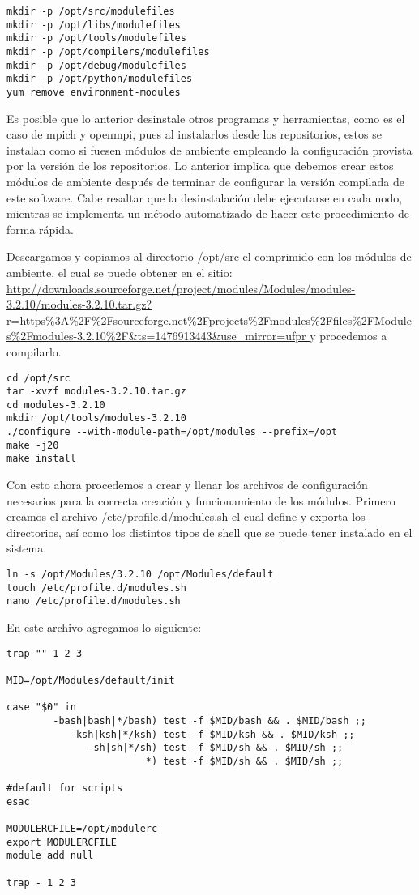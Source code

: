 \begin{lstlisting} 
mkdir -p /opt/src/modulefiles
mkdir -p /opt/libs/modulefiles
mkdir -p /opt/tools/modulefiles
mkdir -p /opt/compilers/modulefiles
mkdir -p /opt/debug/modulefiles
mkdir -p /opt/python/modulefiles
yum remove environment-modules
\end{lstlisting}

Es posible que lo anterior desinstale otros programas y herramientas, como es el caso de mpich y openmpi, pues al instalarlos desde los repositorios, estos se instalan como si fuesen módulos de ambiente empleando la configuración provista por la versión de los repositorios. Lo anterior implica que debemos crear estos módulos de ambiente después de terminar de configurar la versión compilada  de este software. Cabe resaltar que la desinstalación debe ejecutarse en cada nodo, mientras se  implementa un método automatizado de hacer este procedimiento de forma rápida. 

Descargamos y copiamos al directorio /opt/src el comprimido con los módulos de ambiente, el cual  se puede obtener en el sitio: 
\url{http://downloads.sourceforge.net/project/modules/Modules/modules-3.2.10/modules-3.2.10.tar.gz?r=https%
} y procedemos a compilarlo.

\begin{lstlisting} 
cd /opt/src
tar -xvzf modules-3.2.10.tar.gz
cd modules-3.2.10
mkdir /opt/tools/modules-3.2.10
./configure --with-module-path=/opt/modules --prefix=/opt
make -j20
make install
\end{lstlisting}

Con esto ahora procedemos a crear y llenar los archivos de configuración necesarios para la correcta creación y funcionamiento de los módulos. Primero creamos el archivo /etc/profile.d/modules.sh el cual define y exporta los directorios, así como los distintos tipos de shell que se puede tener instalado en el sistema.

\begin{lstlisting} 
ln -s /opt/Modules/3.2.10 /opt/Modules/default
touch /etc/profile.d/modules.sh
nano /etc/profile.d/modules.sh
\end{lstlisting}

En este archivo agregamos lo  siguiente:

\begin{lstlisting} 
trap "" 1 2 3

MID=/opt/Modules/default/init

case "$0" in
        -bash|bash|*/bash) test -f $MID/bash && . $MID/bash ;;
           -ksh|ksh|*/ksh) test -f $MID/ksh && . $MID/ksh ;;
              -sh|sh|*/sh) test -f $MID/sh && . $MID/sh ;;
                        *) test -f $MID/sh && . $MID/sh ;;

#default for scripts
esac 

MODULERCFILE=/opt/modulerc
export MODULERCFILE
module add null

trap - 1 2 3

\end{lstlisting}

